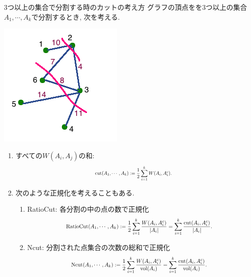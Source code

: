\documentclass[dvipdfmx,11pt]{beamer}
\theoremstyle{definition}
\begin{document}
\begin{frame}{3つ以上の集合で分割する時のカットの考え方}
グラフの頂点をを3つ以上の集合$A_1, \cdots, A_k$で分割するとき, 次を考える.

\begin{minipage}[hc]{.25\textwidth}
\includegraphics[width=\textwidth]{images/over2_cut.png}
\end{minipage}
\begin{minipage}[hc]{.7\textwidth}
\begin{enumerate}
\item すべての$W(A_i, A_j)$の和: 
\begin{equation*}
\scalebox{0.7}
{$\text{cut}(A_1,\cdots,A_k):= \dfrac{1}{2}\displaystyle\sum_{i=1} ^{k} W(A_i, A^c _i).$}
\end{equation*}
\item 次のような正規化を考えることもある.
\begin{enumerate}
\item RatioCut: 各分割の中の点の数で正規化
\begin{equation*}
\scalebox{0.8}
{$\text{RatioCut}(A_1,\cdots,A_k) := \dfrac{1}{2} \displaystyle\sum _{i=1} ^k \dfrac{W(A_i, A_i ^c)}{|A_i|} = \displaystyle\sum _{i=1} ^k \dfrac{\text{cut}(A_i, A_i ^c)}{|A_i|}.$}
\end{equation*}
\item Ncut: 分割された点集合の次数の総和で正規化
\begin{equation*}
\scalebox{0.8}
{$\text{Ncut}(A_1,\cdots,A_k):=\dfrac{1}{2} \displaystyle\sum _{i=1} ^k \dfrac{W(A_i, A_i ^c)}{\text{vol}(A_i)} = \displaystyle\sum _{i=1} ^k \dfrac{\text{cut}(A_i, A_i ^c)}{\text{vol}(A_i)}.$}
\end{equation*}
\end{enumerate}
\end{enumerate}
\end{minipage}
\end{frame}
\end{document}

